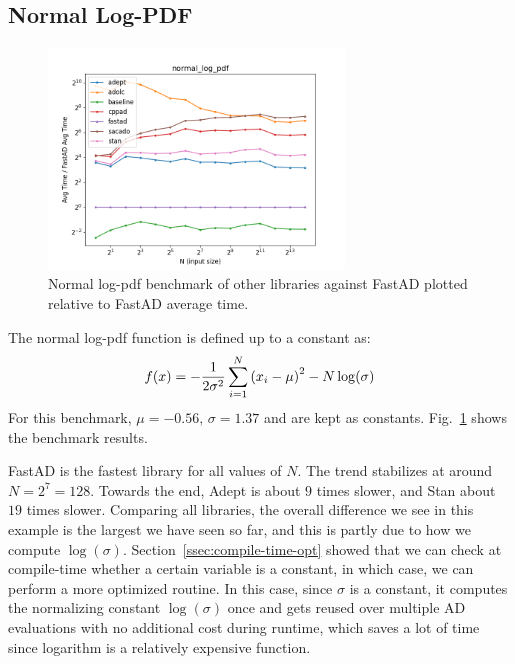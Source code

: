 \subsection{Normal Log-PDF}\label{ssec:normal_log_pdf}

\begin{figure}[t]
    \centering
    \includegraphics[width=0.7\textwidth]{figs/normal_log_pdf_fig.png}
    \caption{%
        Normal log-pdf benchmark of other libraries against FastAD 
        plotted relative to FastAD average time.
    }\label{fig:normal_log_pdf}
\end{figure}

The normal log-pdf function is defined up to a constant as:
\[
    f(x) = -\frac{1}{2\sigma^2} \sum\limits_{i=1}^N \left(x_i - \mu\right)^2 
           -N\log(\sigma)
\]
For this benchmark, $\mu = -0.56,\,\sigma = 1.37$ and are kept as constants.
Fig.~\ref{fig:normal_log_pdf} shows the benchmark results.

FastAD is the fastest library for all values of $N$.
The trend stabilizes at around $N=2^{7}=128$.
Towards the end, Adept is about $ 9$ times slower,
and Stan about $ 19$ times slower.
Comparing all libraries,
the overall difference we see in this example is the largest we have seen so far,
and this is partly due to how we compute $\log(\sigma)$.
Section~\ref{ssec:compile-time-opt} showed that we can check at compile-time
whether a certain variable is a constant, in which case,
we can perform a more optimized routine.
In this case, since $\sigma$ is a constant, it computes the normalizing constant
$\log(\sigma)$ once and gets reused over multiple AD evaluations 
with no additional cost during runtime,
which saves a lot of time since logarithm is a relatively expensive function.
